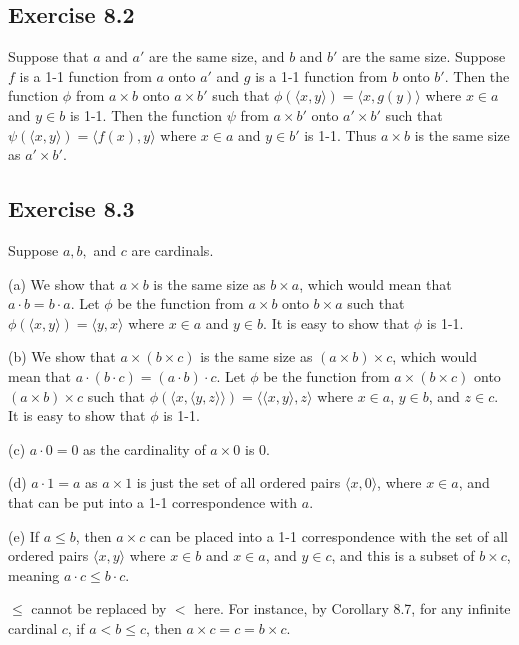 \documentclass{article}
\theoremstyle{definition}
\begin{document}
\subsection*{Exercise 8.2}
Suppose that $a$ and $a'$ are the same size, and $b$ and $b'$ are the same size. Suppose $f$ is a 1-1 function 
from $a$ onto $a'$ and $g$ is a 1-1 function from $b$ onto $b'$.
Then the function $\phi$ from $a\times b$ onto $a\times b'$ such that 
$\phi(\langle x,y\rangle)=\langle x,g(y)\rangle$ where $x\in a$ and $y\in b$ is 1-1. Then the function 
$\psi$ from $a\times b'$ onto $a'\times b'$ such that 
$\psi(\langle x,y\rangle)=\langle f(x),y\rangle$ where $x\in a$ and $y\in b'$ is 1-1. Thus 
$a\times b$ is the same size as $a'\times b'$. 

\subsection*{Exercise 8.3}
Suppose $a,b,$ and $c$ are cardinals.

(a) We show that $a\times b$ is the same size as $b\times a$, which would mean that 
$a\cdot b=b\cdot a$. Let $\phi$ be the function from 
$a\times b$ onto $b\times a$ such that $\phi(\langle x,y\rangle)=\langle y,x\rangle$ where 
$x\in a$ and $y\in b$. It is easy to show that $\phi$ is 1-1.

(b) We show that $a\times (b\times c)$ is the same size as $(a\times b)\times c$, which would 
mean that $a\cdot (b\cdot c)=(a\cdot b)\cdot c$. Let $\phi$ be the function from 
$a\times (b\times c)$ onto $(a\times b)\times c$ such that 
$\phi(\langle x,\langle y,z\rangle\rangle)=\langle\langle x,y\rangle,z\rangle$ where 
$x\in a$, $y\in b$, and $z\in c$. It is easy to show that $\phi$ is 1-1.

(c) $a\cdot 0=0$ as the cardinality of $a\times 0$ is 0.

(d) $a\cdot 1=a$ as $a\times 1$ is just the set of all ordered pairs 
$\langle x,0\rangle$, where $x\in a$, and that can be put into a 1-1 correspondence with 
$a$.

(e) If $a\le b$, then $a\times c$ can be placed into a 1-1 correspondence with the set of all ordered pairs 
$\langle x,y\rangle$ where $x\in b$ and $x\in a$, and $y\in c$, and this is a subset of $b\times c$, meaning 
$a\cdot c\le b\cdot c$. 

$\le$ cannot be replaced by $<$ here. For instance, by Corollary 8.7, for any infinite cardinal $c$, 
if $a<b\le c$, then $a\times c=c=b\times c$.
\end{document}
